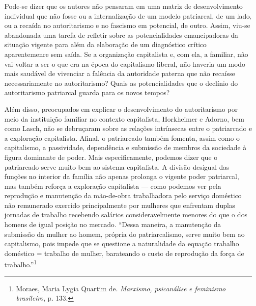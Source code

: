 Pode-se dizer que os autores não pensaram em uma matriz de
desenvolvimento individual que não fosse ou a internalização de um
modelo patriarcal, de um lado, ou a recaída no autoritarismo e no
fascismo em potencial, de outro. Assim, viu-se abandonada uma tarefa de
refletir sobre as potencialidades emancipadoras da situação vigente para
além da elaboração de um diagnóstico crítico aparentemenre sem saída. Se
a organização capitalista e, com ela, a familiar, não vai voltar a ser o
que era na época do capitalismo liberal, não haveria um modo mais
saudável de vivenciar a falência da autoridade paterna que não recaísse
necessariamente no autoritarismo? Quais as potencialidades que o
declínio do autoritarismo patriarcal guarda para os novos tempos?

Além disso, preocupados em explicar o desenvolvimento do autoritarismo
por meio da instituição familiar no contexto capitalista, Horkheimer e
Adorno, bem como Lasch, não se debruçaram sobre as relações intrínsecas
entre o patriarcado e a exploração capitalista. Afinal, o patriarcado
também fomenta, assim como o capitalismo, a passividade, dependência e
submissão de membros da sociedade à figura dominante de poder. Mais
especificamente, podemos dizer que o patriarcado serve muito bem ao
sistema capitalista. A divisão desigual das funções no interior da
família não apenas prolonga o vigente poder patriarcal, mas também
reforça a exploração capitalista --- como podemos ver pela reprodução e
manutenção da mão-de-obra trabalhadora pelo serviço doméstico não
remunerado exercido principalmente por mulheres que enfrentam duplas
jornadas de trabalho recebendo salários consideravelmente menores do que
o dos homens de igual posição no mercado. ``Dessa maneira, a manutenção
da submissão da mulher ao homem, própria do patriarcalismo, serve muito
bem ao capitalismo, pois impede que se questione a naturalidade da
equação trabalho doméstico = trabalho de mulher, barateando o custo de
reprodução da força de trabalho.''\footnote{Moraes, Maria Lygia Quartim
  de. \emph{Marxismo, psicanálise e feminismo brasileiro}, p. 133.}

